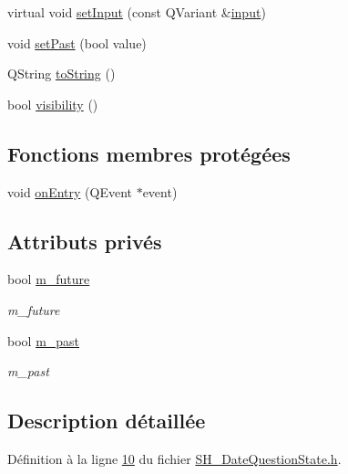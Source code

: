 \begin{DoxyCompactItemize}
\item 
virtual void \hyperlink{classSH__QuestionState_ab40b6202090d1afcc965e124b2deb88a}{set\-Input} (const Q\-Variant \&\hyperlink{classSH__InOutState_a8e1b78069343122df7713624a1a5a100}{input})
\item 
void \hyperlink{classSH__DateQuestionState_a6f376c24355deb573b3132d18cf50341}{set\-Past} (bool value)
\item 
Q\-String \hyperlink{classSH__GenericState_a7779babbb40f3f8faa71112204d9804f}{to\-String} ()
\item 
bool \hyperlink{classSH__InOutState_a3a18752c4122c26a2ebf38310c9c1b75}{visibility} ()
\end{DoxyCompactItemize}
\subsection*{Fonctions membres protégées}
\begin{DoxyCompactItemize}
\item 
void \hyperlink{classSH__GenericState_a68c67ef95738e01cd34cd5926f4932fb}{on\-Entry} (Q\-Event $\ast$event)
\end{DoxyCompactItemize}
\subsection*{Attributs privés}
\begin{DoxyCompactItemize}
\item 
bool \hyperlink{classSH__DateQuestionState_a0a1577dc70f9c1120a6d623f8eb635c8}{m\-\_\-future}
\begin{DoxyCompactList}\small\item\em m\-\_\-future \end{DoxyCompactList}\item 
bool \hyperlink{classSH__DateQuestionState_afa33fd208cf539167bcc26c83e57d803}{m\-\_\-past}
\begin{DoxyCompactList}\small\item\em m\-\_\-past \end{DoxyCompactList}\end{DoxyCompactItemize}


\subsection{Description détaillée}


Définition à la ligne \hyperlink{SH__DateQuestionState_8h_source_l00010}{10} du fichier \hyperlink{SH__DateQuestionState_8h_source}{S\-H\-\_\-\-Date\-Question\-State.\-h}.




